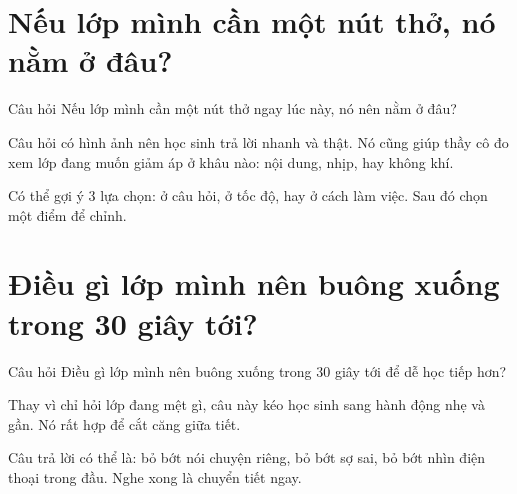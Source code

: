 \section{Nếu lớp mình cần một nút thở, nó nằm ở đâu?}
\begin{cauhoibox}{Câu hỏi}
Nếu lớp mình cần một nút thở ngay lúc này, nó nên nằm ở đâu?
\end{cauhoibox}
\begin{taisaocoich}
Câu hỏi có hình ảnh nên học sinh trả lời nhanh và thật. Nó cũng giúp thầy cô đo xem lớp đang muốn giảm áp ở khâu nào: nội dung, nhịp, hay không khí.
\end{taisaocoich}
\begin{goiybien}
Có thể gợi ý 3 lựa chọn: ở câu hỏi, ở tốc độ, hay ở cách làm việc. Sau đó chọn một điểm để chỉnh.
\end{goiybien}
\ngancach

\section{Điều gì lớp mình nên buông xuống trong 30 giây tới?}
\begin{cauhoibox}{Câu hỏi}
Điều gì lớp mình nên buông xuống trong 30 giây tới để dễ học tiếp hơn?
\end{cauhoibox}
\begin{taisaocoich}
Thay vì chỉ hỏi lớp đang mệt gì, câu này kéo học sinh sang hành động nhẹ và gần. Nó rất hợp để cắt căng giữa tiết.
\end{taisaocoich}
\begin{goiybien}
Câu trả lời có thể là: bỏ bớt nói chuyện riêng, bỏ bớt sợ sai, bỏ bớt nhìn điện thoại trong đầu. Nghe xong là chuyển tiết ngay.
\end{goiybien}
